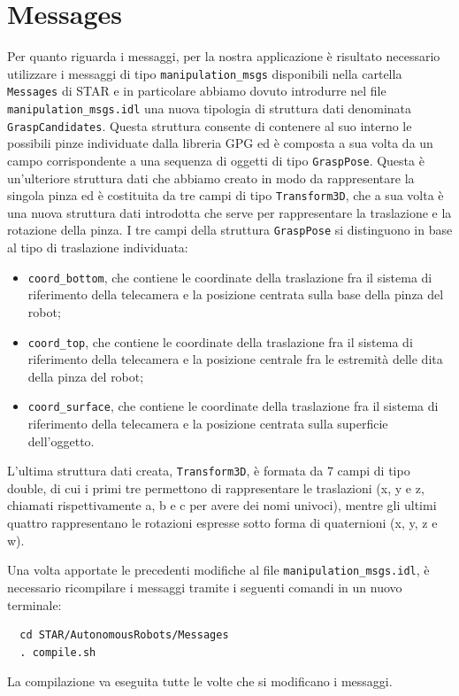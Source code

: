 \documentclass{report}
\begin{document}
\section{Messages}\label{messages}
Per quanto riguarda i messaggi, per la nostra applicazione è risultato necessario utilizzare i messaggi di tipo \texttt{manipulation\_msgs} disponibili nella cartella \texttt{Messages} di STAR e in particolare abbiamo dovuto introdurre nel file \texttt{manipulation\_msgs.idl} una nuova tipologia di struttura dati denominata \texttt{GraspCandidates}. Questa struttura consente di contenere al suo interno le possibili pinze individuate dalla libreria GPG ed è composta a sua volta da un campo corrispondente a una sequenza di oggetti di tipo \texttt{GraspPose}. Questa è un'ulteriore struttura dati che abbiamo creato in modo da rappresentare la singola pinza ed è costituita da tre campi di tipo \texttt{Transform3D}, che a sua volta è una nuova struttura dati introdotta che serve per rappresentare la traslazione e la rotazione della pinza. I tre campi della struttura \texttt{GraspPose} si distinguono in base al tipo di traslazione individuata:
\begin{itemize}
	\item \texttt{coord\_bottom}, che contiene le coordinate della traslazione fra il sistema di riferimento della telecamera e la posizione centrata sulla base della pinza del robot;
	\item \texttt{coord\_top}, che contiene le coordinate della traslazione fra il sistema di riferimento della telecamera e la posizione centrale fra le estremità delle dita della pinza del robot;
	\item \texttt{coord\_surface}, che contiene le coordinate della traslazione fra il sistema di riferimento della telecamera e la posizione centrata sulla superficie dell'oggetto.
\end{itemize}
L'ultima struttura dati creata, \texttt{Transform3D}, è formata da 7 campi di tipo double, di cui i primi tre permettono di rappresentare le traslazioni (x, y e z, chiamati rispettivamente a, b e c per avere dei nomi univoci), mentre gli ultimi quattro rappresentano le rotazioni espresse sotto forma di quaternioni (x, y, z e w). \par
Una volta apportate le precedenti modifiche al file \texttt{manipulation\_msgs.idl}, è necessario ricompilare i messaggi tramite i seguenti comandi in un nuovo terminale:
\begin{verbatim}
  cd STAR/AutonomousRobots/Messages
  . compile.sh
\end{verbatim}
La compilazione va eseguita tutte le volte che si modificano i messaggi.
\end{document}
